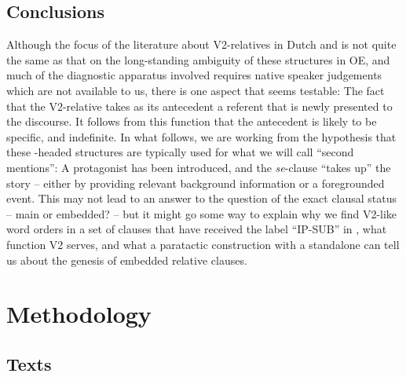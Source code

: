 \documentclass[output=paper,colorlinks,citecolor=brown]{langscibook}
\begin{document}
\subsection{Conclusions} \label{sec:los:3.4}
Although the focus of the literature about V2-relatives in Dutch and  is not quite the same as that on the long-standing ambiguity of these structures in OE, and much of the diagnostic apparatus involved requires native speaker judgements which are not available to us, there is one aspect that seems testable: The fact that the V2-relative takes as its antecedent a referent that is newly presented to the discourse. It follows from this function that the antecedent is likely to be specific, and indefinite. In what follows, we are working from the hypothesis that these -headed structures are typically used for what we will call “second mentions”: A protagonist has been introduced, and the \textit{se}{}-clause “takes up” the story – either by providing relevant background information or a foregrounded event. This may not lead to an answer to the question of the exact clausal status – main or embedded? – but it might go some way to explain why we find V2-like word orders in a set of clauses that have received the label “IP-SUB” in , what function V2 serves, and what a paratactic construction with a standalone  can tell us about the genesis of embedded relative clauses.


\section{Methodology} \label{sec:los:4}
\subsection{Texts}\label{sec:los:4.1}
\end{document}

